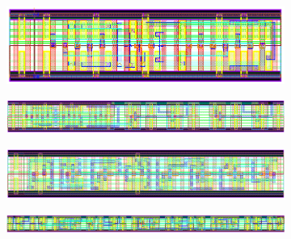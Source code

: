 \documentclass[ecp,tc, english]{iiufrgs}
\begin{document}
\begin{figure}[H]
\centering
\begin{subfigure}[b]{\textwidth}
   \includegraphics[width=1\linewidth]{CMOS.png}
   \caption{}
   \label{fig:Ng1} 
\end{subfigure}

\begin{subfigure}[b]{\textwidth}
   \includegraphics[width=1\linewidth]{CMOSST.png}
   \caption{}
   \label{fig:Ng2}
\end{subfigure}

\caption{}
\end{figure}

\begin{figure}[H]
\centering
\begin{subfigure}[b]{\textwidth}
   \includegraphics[width=1\linewidth]{TGA.png}
   \caption{}
   \label{fig:Ng1} 
\end{subfigure}

\begin{subfigure}[b]{\textwidth}
   \includegraphics[width=1\linewidth]{TGAST.png}
   \caption{}
   \label{fig:Ng2}
\end{subfigure}

\caption{}
\end{figure}
\end{document}
